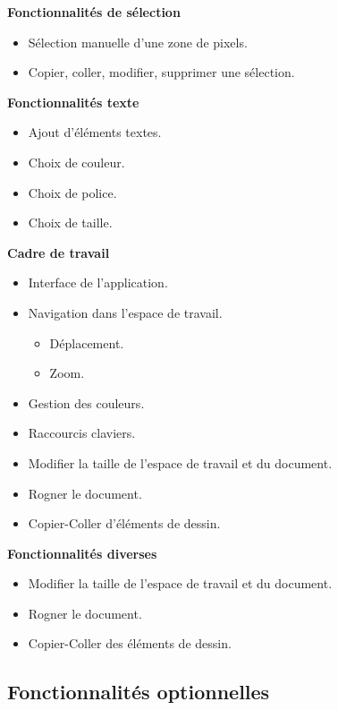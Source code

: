 \documentclass[11pt, a4paper, french]{article}
\begin{document}
			\textbf{Fonctionnalités de sélection}
			\begin{itemize}[label=\textbullet]
				\item Sélection manuelle d'une zone de pixels.
				\item Copier, coller, modifier, supprimer une sélection. \\
			\end{itemize}

			\textbf{Fonctionnalités texte}
			\begin{itemize}[label=\textbullet]
				\item Ajout d'éléments textes.
				\item Choix de couleur.
				\item Choix de police.
				\item Choix de taille. \\
			\end{itemize}

			\textbf{Cadre de travail}
			\begin{itemize}[label=\textbullet]
				\item Interface de l'application.
				\item Navigation dans l'espace de travail.
				\begin{itemize}[label=\textbullet]
					\item Déplacement.
					\item Zoom.
				\end{itemize}
				\item Gestion des couleurs.
				\item Raccourcis claviers.
				\item Modifier la taille de l'espace de travail et du document.
				\item Rogner le document.
				\item Copier-Coller d'éléments de dessin. \\
			\end{itemize}

			\textbf{Fonctionnalités diverses}
			\begin{itemize}[label=\textbullet]
				\item Modifier la taille de l'espace de travail et du document.
				\item Rogner le document.
				\item Copier-Coller des éléments de dessin. \\
			\end{itemize}


		\subsection {Fonctionnalités optionnelles}
\end{document}
